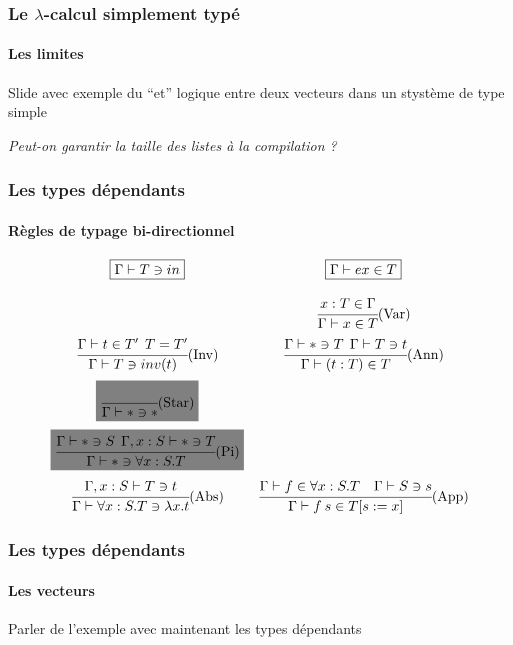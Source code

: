 \documentclass{beamer}
\newcommand{\highlight}[1]{\text{\colorbox{gray}{$#1$}}}
\newcommand{\subst}[3]{#1[#2 := #3]}
\begin{document}
\begin{frame}[b,fragile]
  \frametitle{Le $\lambda$-calcul simplement typé}
  \framesubtitle{Les limites}

  Slide avec exemple du ``et'' logique entre deux vecteurs 
  dans un stystème de type simple


  \vfill

\begin{flushright}
  \large{\textit{Peut-on garantir la taille des listes à la compilation ?}}
\end{flushright}

  
\end{frame}
\begin{frame}
  \frametitle{Les types dépendants}
  \framesubtitle{Règles de typage bi-directionnel}

  
  \[
  \begin{array}{cc}
  \boxed{\Gamma\vdash T \ni in}
  &
  \boxed{\Gamma\vdash ex \in T}
  \bigskip
  \\ 
  &
  \cfrac{x:T \in \Gamma}
        {\Gamma \vdash x \in T }\mbox{(Var)}
  \medskip
  \\
  \cfrac{\Gamma \vdash t \in T' \:\: T=T'}
        {\Gamma\vdash T \ni inv(t)}\mbox{(Inv)}
  &
  \cfrac{\Gamma\vdash * \ni T \:\:\Gamma\vdash T \ni t}
        {\Gamma\vdash (t:T) \in T}\mbox{(Ann)}
  \medskip
  \\
  \highlight{
  \cfrac{}
        {\Gamma \vdash * \ni *}\mbox{(Star)} }
  \medskip
  \\
  \highlight{
  \cfrac{\Gamma \vdash * \ni S\:\:\Gamma,x:S \vdash *\ni T}
        {\Gamma\vdash * \ni \forall x:S.T}\mbox{(Pi)} }
  \medskip
  \\
  \cfrac{\Gamma,x:S\vdash T \ni t}
        {\Gamma \vdash \forall x:S.T \ni \lambda x. t}\mbox{(Abs)} 
  & 
  \cfrac{\Gamma \vdash f \in \forall x:S.T \quad \Gamma\vdash S \ni s }
        {\Gamma\vdash f\:s\in \subst{T}{s}{x}}\mbox{(App)} 
  \end{array}
  \]


\end{frame}
\begin{frame}
  \frametitle{Les types dépendants}
  \framesubtitle{Les vecteurs}

  Parler de l'exemple avec maintenant les types dépendants

\end{frame}
\end{document}
